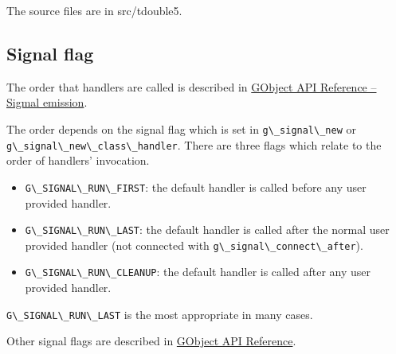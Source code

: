 The source files are in src/tdouble5.

\subsection{Signal flag}\label{signal-flag}

The order that handlers are called is described in
\href{https://docs.gtk.org/gobject/concepts.html\#signal-emission}{GObject
API Reference -- Sigmal emission}.

The order depends on the signal flag which is set in
\passthrough{\lstinline!g\_signal\_new!} or
\passthrough{\lstinline!g\_signal\_new\_class\_handler!}. There are
three flags which relate to the order of handlers' invocation.

\begin{itemize}
\tightlist
\item
  \passthrough{\lstinline!G\_SIGNAL\_RUN\_FIRST!}: the default handler
  is called before any user provided handler.
\item
  \passthrough{\lstinline!G\_SIGNAL\_RUN\_LAST!}: the default handler is
  called after the normal user provided handler (not connected with
  \passthrough{\lstinline!g\_signal\_connect\_after!}).
\item
  \passthrough{\lstinline!G\_SIGNAL\_RUN\_CLEANUP!}: the default handler
  is called after any user provided handler.
\end{itemize}

\passthrough{\lstinline!G\_SIGNAL\_RUN\_LAST!} is the most appropriate
in many cases.

Other signal flags are described in
\href{https://docs.gtk.org/gobject/flags.SignalFlags.html}{GObject API
Reference}.
